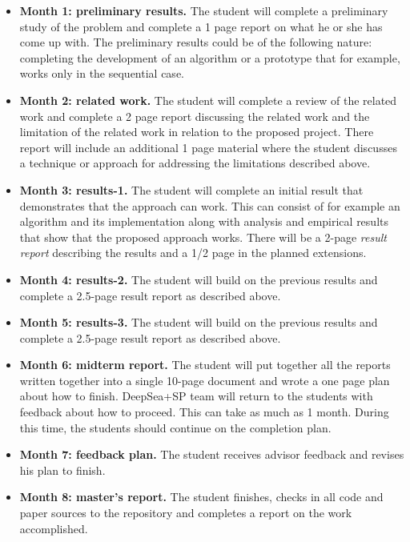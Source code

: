 \documentclass[11pt]{article}
\begin{document}
\begin{itemize}

\item {\bf Month 1: preliminary results.}  The student will complete a
  preliminary study of the problem and complete a 1 page report on
  what he or she has come up with. The preliminary results could be of
  the following nature: completing the development of an algorithm or
  a prototype that for example, works only in the sequential case.

\item {\bf Month 2: related work.}  The student will complete a review
  of the related work and complete a 2 page report discussing the
  related work and the limitation of the related work in relation to
  the proposed project.  There report will include an additional 1
  page material where the student discusses a technique or approach
  for addressing the limitations described above.

\item {\bf Month 3: results-1.}  The student will complete an initial
  result that demonstrates that the approach can work. This can
  consist of for example an algorithm and its implementation along
  with analysis and empirical results that show that the proposed
  approach works.  There will be a 2-page {\em result report}
  describing the results and a 1/2 page in the planned extensions.

\item {\bf Month 4: results-2.}  The student will build on the
  previous results and complete a 2.5-page result report as described
  above.

\item {\bf Month 5: results-3.}  The student will build on the
  previous results and complete a 2.5-page result report as described
  above.

\item {\bf Month 6: midterm report.}  The student will put together
  all the reports written together into a single 10-page document and
  wrote a one page plan about how to finish.  DeepSea+SP team will
  return to the students with feedback about how to proceed.  This can
  take as much as 1 month. During this time, the students should
  continue on the completion plan.


\item {\bf Month 7: feedback plan.}  The student receives advisor
  feedback and revises his plan to finish.  

\item {\bf Month 8: master's report.} The student finishes, checks in
  all code and paper sources to the repository and completes a report
  on the work accomplished.

\end{itemize}
\end{document}
